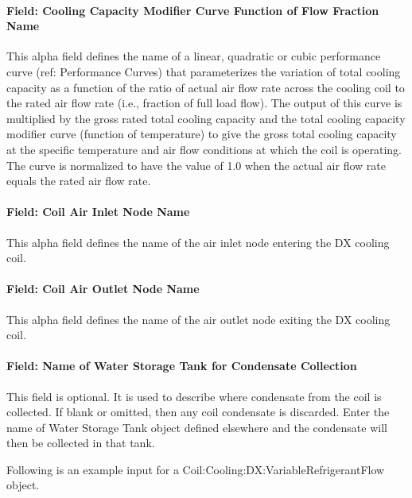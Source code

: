 \paragraph{Field: Cooling Capacity Modifier Curve Function of Flow Fraction Name}\label{field-cooling-capacity-modifier-curve-function-of-flow-fraction-name}

This alpha field defines the name of a linear, quadratic or cubic performance curve (ref: Performance Curves) that parameterizes the variation of total cooling capacity as a function of the ratio of actual air flow rate across the cooling coil to the rated air flow rate (i.e., fraction of full load flow). The output of this curve is multiplied by the gross rated total cooling capacity and the total cooling capacity modifier curve (function of temperature) to give the gross total cooling capacity at the specific temperature and air flow conditions at which the coil is operating. The curve is normalized to have the value of 1.0 when the actual air flow rate equals the rated air flow rate.

\paragraph{Field: Coil Air Inlet Node Name}\label{field-coil-air-inlet-node-name}

This alpha field defines the name of the air inlet node entering the DX cooling coil.

\paragraph{Field: Coil Air Outlet Node Name}\label{field-coil-air-outlet-node-name}

This alpha field defines the name of the air outlet node exiting the DX cooling coil.

\paragraph{Field: Name of Water Storage Tank for Condensate Collection}\label{field-name-of-water-storage-tank-for-condensate-collection}

This field is optional. It is used to describe where condensate from the coil is collected. If blank or omitted, then any coil condensate is discarded. Enter the name of Water Storage Tank object defined elsewhere and the condensate will then be collected in that tank.

Following is an example input for a Coil:Cooling:DX:VariableRefrigerantFlow object.

